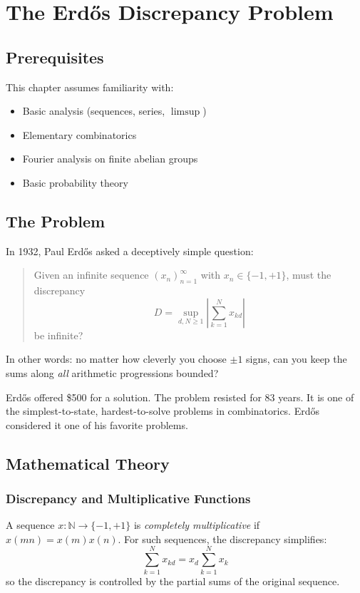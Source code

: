 \let\LocalMacro\relax

\chapter{The Erdős Discrepancy Problem}

\section{Prerequisites}
This chapter assumes familiarity with:
\begin{itemize}
\item Basic analysis (sequences, series, $\limsup$)
\item Elementary combinatorics
\item Fourier analysis on finite abelian groups
\item Basic probability theory
\end{itemize}

\section{The Problem}
In 1932, Paul Erdős asked a deceptively simple question:

\begin{quote}
Given an infinite sequence $(x_n)_{n=1}^\infty$ with $x_n \in \{-1, +1\}$, must the discrepancy
\[
D = \sup_{d, N \ge 1} \left| \sum_{k=1}^N x_{kd} \right|
\]
be infinite?
\end{quote}

In other words: no matter how cleverly you choose $\pm 1$ signs, can you keep the sums along \emph{all} arithmetic progressions bounded?

\begin{historicalbox}
Erdős offered \$500 for a solution. The problem resisted for 83 years. It is one of the simplest-to-state, hardest-to-solve problems in combinatorics. Erdős considered it one of his favorite problems.
\end{historicalbox}

\section{Mathematical Theory}

\subsection{Discrepancy and Multiplicative Functions}
A sequence $x: \mathbb{N} \to \{-1, +1\}$ is \emph{completely multiplicative} if $x(mn) = x(m)x(n)$. For such sequences, the discrepancy simplifies:
\[
\sum_{k=1}^N x_{kd} = x_d \sum_{k=1}^N x_k
\]
so the discrepancy is controlled by the partial sums of the original sequence.

